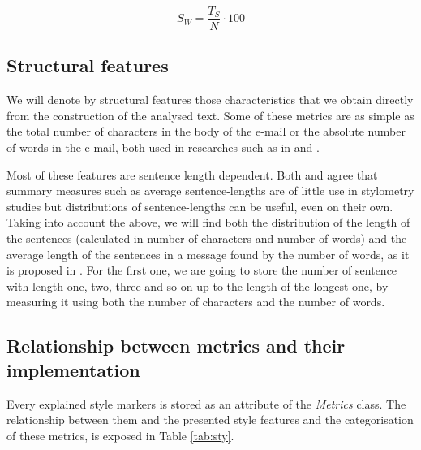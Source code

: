 $$
S_W = \frac{T_S}{N}\cdot 100
$$

\subsection{Structural features}\label{ssect:strucf}

We will denote by structural features those characteristics that we obtain directly from the construction of the analysed text. Some of these metrics are as simple as the total number of characters in the body of the e-mail or the absolute number of words in the e-mail, both used in researches such as in \cite{corney2001identifying} and \cite{ril2014determination}.

Most of these features are sentence length dependent. Both \cite{tallentire1972appraisal} and \cite{kjetsaa1979and} agree that summary measures such as average sentence-lengths are of little use in stylometry studies but distributions of sentence-lengths can be useful, even on their own. Taking into account the above, we will find both the distribution of the length of the sentences (calculated in number of characters and number of words) and the average length of the sentences in a message found by the number of words, as it is proposed in \cite{corney2001identifying}. For the first one, we are going to store the number of sentence with length one, two, three and so on up to the length of the longest one, by measuring it  using both the number of characters and the number of words.

\subsection{Relationship between metrics and their implementation}\label{ssect:relmet}
Every explained style markers is stored as an attribute of the \textit{Metrics} class. The relationship between them and the presented style features and the categorisation of these metrics, is exposed in Table \ref{tab:sty}.

